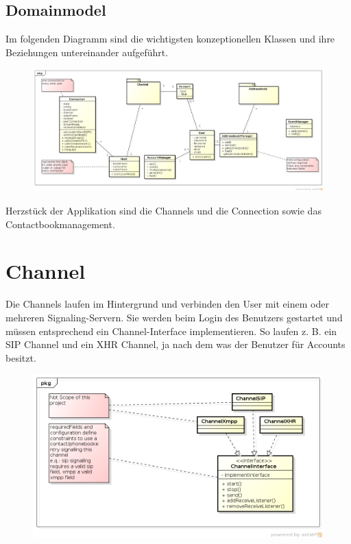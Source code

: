 \begin{landscape}
\section{Domainmodel}
	Im folgenden Diagramm sind die wichtigsten konzeptionellen Klassen und ihre Beziehungen untereinander aufgeführt.
	\begin{figure}[H]
		\centering
		\includegraphics[width=1.2\textwidth]{../architekturanalayse/img/domain.png}
	\end{figure}
	Herzstück der Applikation sind die Channels und die Connection sowie das Contactbookmanagement.

\end{landscape}

\section{Channel}
	Die Channels laufen im Hintergrund und verbinden den User mit einem oder mehreren Signaling-Servern. Sie werden beim Login des Benutzers gestartet und müssen entsprechend ein Channel-Interface implementieren. So laufen z. B. ein SIP Channel und ein XHR Channel, ja nach dem was der Benutzer für Accounts besitzt.
	\begin{figure}[H]
		\centering
		\includegraphics[width=\textwidth]{../architekturanalayse/img/channel.png}
	\end{figure}
	
